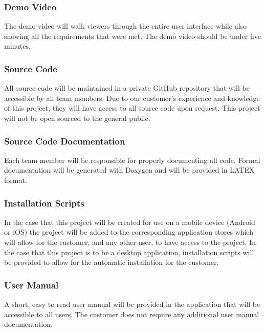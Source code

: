 \subsubsection{Demo Video}
The demo video will walk viewers through the entire user interface while also showing all the requirements that were met. The demo video should be under five minutes.

\subsubsection{Source Code}
All source code will be maintained in a private GitHub repository that will be accessible by all team members. Due to our customer's experience and knowledge of this project, they will have access to all source code upon request. This project will not be open sourced to the general public.

\subsubsection{Source Code Documentation}
Each team member will be responsible for properly documenting all code. Formal documentation will be generated with Doxygen and will be provided in LATEX format.

\subsubsection{Installation Scripts}
In the case that this project will be created for use on a mobile device (Android or iOS) the project will be added to the corresponding application stores which will allow for the customer, and any other user, to have access to the project. In the case that this project is to be a desktop application, installation scripts will be provided to allow for the automatic installation for the customer.

\subsubsection{User Manual}
A short, easy to read user manual will be provided in the application that will be accessible to all users. The customer does not require any additional user manual documentation.
